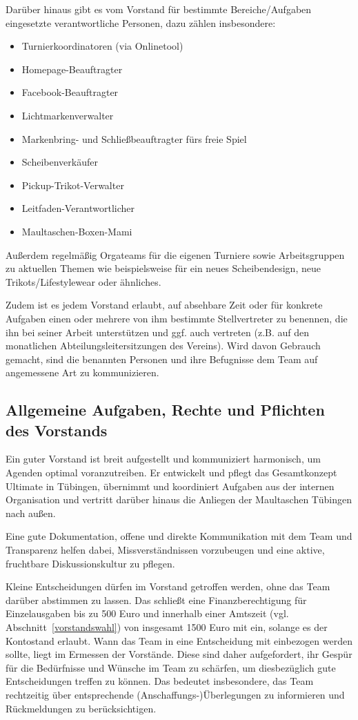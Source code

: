 \documentclass[a4 paper, 11pt]{article}
\begin{document}
Darüber hinaus gibt es vom Vorstand für bestimmte Bereiche/Aufgaben eingesetzte verantwortliche Personen, dazu zählen insbesondere:
\begin{itemize}
	\item Turnierkoordinatoren (via Onlinetool)
	\item Homepage-Beauftragter
	\item Facebook-Beauftragter
	\item Lichtmarkenverwalter
	\item Markenbring- und Schließbeauftragter fürs freie Spiel
	\item Scheibenverkäufer
	\item Pickup-Trikot-Verwalter
	\item Leitfaden-Verantwortlicher
	\item Maultaschen-Boxen-Mami
\end{itemize}
Außerdem regelmäßig Orgateams für die eigenen Turniere sowie Arbeitsgruppen zu aktuellen Themen wie beispielsweise für ein neues Scheibendesign, neue Trikots/Lifestylewear oder ähnliches.

Zudem ist es jedem Vorstand erlaubt, auf absehbare Zeit oder für konkrete Aufgaben einen oder mehrere von ihm bestimmte Stellvertreter zu benennen, die ihn bei seiner Arbeit unterstützen und ggf. auch vertreten (z.B. auf den monatlichen Abteilungsleitersitzungen des Vereins). Wird davon Gebrauch gemacht, sind die benannten Personen und ihre Befugnisse dem Team auf angemessene Art zu kommunizieren.

\subsection{Allgemeine Aufgaben, Rechte und Pflichten des Vorstands}
Ein guter Vorstand ist breit aufgestellt und kommuniziert harmonisch, um Agenden optimal voranzutreiben. Er entwickelt und pflegt das Gesamtkonzept Ultimate in Tübingen, übernimmt und koordiniert Aufgaben aus der internen Organisation und vertritt darüber hinaus die Anliegen der Maultaschen Tübingen nach außen.

Eine gute Dokumentation, offene und direkte Kommunikation mit dem Team und Transparenz helfen dabei, Missverständnissen vorzubeugen und eine aktive, fruchtbare Diskussionskultur zu pflegen.

Kleine Entscheidungen dürfen im Vorstand getroffen werden, ohne das Team darüber abstimmen zu lassen. Das schließt eine Finanzberechtigung für Einzelausgaben bis zu 500 Euro und innerhalb einer Amtszeit (vgl. Abschnitt~\ref{vorstandswahl}) von insgesamt 1500 Euro mit ein, solange es der Kontostand erlaubt. Wann das Team in eine Entscheidung mit einbezogen werden sollte, liegt im Ermessen der Vorstände. Diese sind daher aufgefordert, ihr Gespür für die Bedürfnisse und Wünsche im Team zu schärfen, um diesbezüglich gute Entscheidungen treffen zu können. Das bedeutet insbesondere, das Team rechtzeitig über entsprechende (Anschaffungs-)Überlegungen zu informieren und Rückmeldungen zu berücksichtigen.
\end{document}
